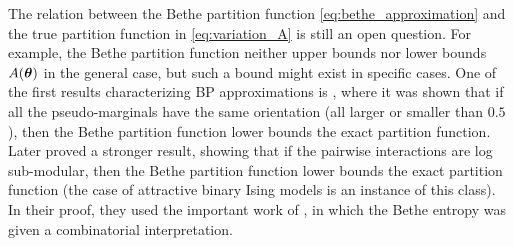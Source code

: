The relation between the Bethe partition function \eqref{eq:bethe_approximation} and the true partition function in \eqref{eq:variation_A} is still an open question.
For example, the Bethe partition function neither upper bounds nor lower bounds $A(\boldsymbol{\theta})$ in the general case, but such a bound might exist in specific cases.
One of the first results characterizing BP approximations is \cite{AlanNips2007}, where it was shown that if all the pseudo-marginals have the same orientation (all larger or smaller than $0.5$), then the Bethe partition function lower bounds the exact partition function.
Later \cite{RuozziNips2012} proved a stronger result, showing that if the pairwise interactions are log sub-modular, then the Bethe partition function lower bounds the exact partition function (the case of attractive binary Ising models is an instance of this class).
In their proof, they used the important work of  \cite{vontobel2013counting}, in which the Bethe entropy was given a combinatorial interpretation.

